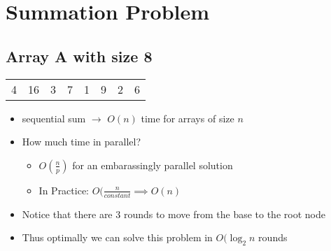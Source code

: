 \documentclass[twoside]{article}
\begin{document}
\section{Summation Problem}
\subsection{Array A with size 8}
\begin{table}[]
   \begin{tabular}{llllllll}
         4 & 16 & 3 & 7 & 1 & 9 & 2 & 6
   \end{tabular}
\end{table}
\begin{itemize}
   \item sequential sum $\rightarrow$ $O(n)$ time for arrays of size $n$
   \item How much time in parallel?
   \begin{itemize}
      \item $O(\frac{n}{p})$ for an embarassingly parallel solution
      \item In Practice: $O(\frac{n}{constant} \implies O(n)$
   \end{itemize}
\end{itemize}
\begin{itemize}
   \item Notice that there are 3 rounds to move from the base to the root node
   \item Thus optimally we can solve this problem in $O(\log_{2}n$ rounds
\end{itemize}



\end{document}
